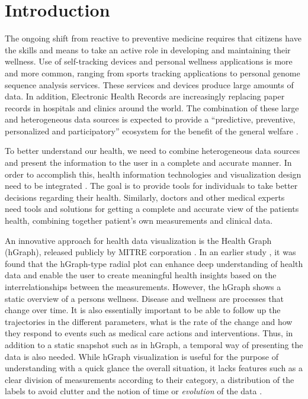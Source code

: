 \documentclass[twocolumn]{bmcart}%
\begin{document}


\section*{Introduction}
The ongoing shift from reactive to preventive medicine requires that citizens have the skills and means to take an active role in developing and maintaining their wellness. Use of self-tracking devices and personal wellness applications is more and more common, ranging from sports tracking applications to personal genome sequence analysis services. These services and devices produce large amounts of data. In addition, Electronic Health Records are increasingly replacing paper records in hospitals and clinics around the world. The combination of these large and heterogeneous data sources is expected to provide a ``predictive, preventive, personalized and participatory'' ecosystem for the benefit of the general welfare \cite{Hood2012613}.

To better understand our health, we need to combine heterogeneous data sources and present the information to the user in a complete and accurate manner. In order to accomplish this, health information technologies and visualization design need to be integrated \cite{lesselroth2011data}. The goal is to provide tools for individuals to take better  decisions regarding their health. Similarly, doctors and other medical experts need tools and solutions for getting a complete and accurate view of the patients health, combining together patient's own measurements and clinical data.

An innovative approach for health data visualization is the Health Graph (hGraph), released publicly by MITRE corporation \cite{follett2012hgraph}. In an earlier study \cite{EMBCLedNiem}, it was found that the hGraph-type radial plot can enhance deep understanding of health data and enable the user to create meaningful health insights based on the interrelationships between the measurements. However, the hGraph shows a static overview of a persons wellness. Disease and wellness are processes that change over time. It is also essentially important to be able to follow up the trajectories in the different parameters, what is the rate of the change and how they respond to events such as medical care actions and interventions. Thus, in addition to a static snapshot such as in hGraph, a temporal way of presenting the data is also needed. While hGraph visualization is useful for the purpose of understanding with a quick glance the overall situation, it lacks features such as a clear division of measurements according to their category, a distribution of the labels to avoid clutter and the notion of time or \textit{evolution} of the data \cite{EMBCLedNiem}. 
\end{document}
